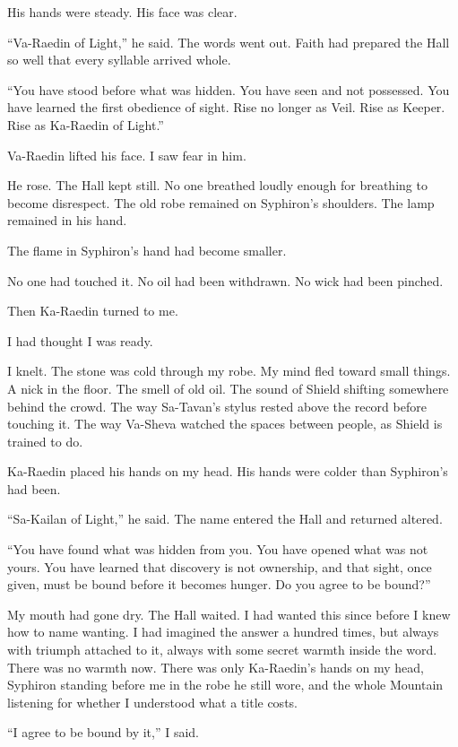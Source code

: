 His hands were steady.
His face was clear.\par
``Va-Raedin of Light,'' he said.
The words went out.
Faith had prepared the Hall so well that every syllable arrived whole.\par
``You have stood before what was hidden.
You have seen and not possessed.
You have learned the first obedience of sight.
Rise no longer as Veil.
Rise as Keeper.
Rise as Ka-Raedin of Light.''\par
Va-Raedin lifted his face.
I saw fear in him.\par
He rose.
The Hall kept still.
No one breathed loudly enough for breathing to become disrespect.
The old robe remained on Syphiron's shoulders.
The lamp remained in his hand.\par
The flame in Syphiron's hand had become smaller.\par
No one had touched it.
No oil had been withdrawn.
No wick had been pinched.\par
Then Ka-Raedin turned to me.\par
I had thought I was ready.\par
I knelt.
The stone was cold through my robe.
My mind fled toward small things.
A nick in the floor.
The smell of old oil.
The sound of Shield shifting somewhere behind the crowd.
The way Sa-Tavan's stylus rested above the record before touching it.
The way Va-Sheva watched the spaces between people, as Shield is trained to do.\par
Ka-Raedin placed his hands on my head.
His hands were colder than Syphiron's had been.\par
``Sa-Kailan of Light,'' he said.
The name entered the Hall and returned altered.\par
``You have found what was hidden from you.
You have opened what was not yours.
You have learned that discovery is not ownership, and that sight, once given, must be bound before it becomes hunger.
Do you agree to be bound?''\par
My mouth had gone dry.
The Hall waited.
I had wanted this since before I knew how to name wanting.
I had imagined the answer a hundred times, but always with triumph attached to it, always with some secret warmth inside the word.
There was no warmth now.
There was only Ka-Raedin's hands on my head, Syphiron standing before me in the robe he still wore, and the whole Mountain listening for whether I understood what a title costs.\par
``I agree to be bound by it,'' I said.
